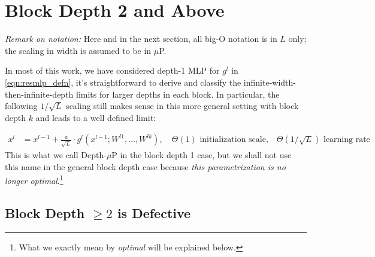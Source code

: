 \section{Block Depth 2 and Above}

\label{sec:bd2}

\emph{Remark on notation:} Here and in the next section, all big-O notation is in $L$ only; the scaling in width is assumed to be in $\mu$P.

In most of this work, we have considered depth-1 MLP for $g^l$ in \cref{eqn:resmlp_defn}, it's straightforward to derive and classify the infinite-width-then-infinite-depth limits for larger depths in each block.
In particular, the following $1/\sqrt{L}$ scaling still makes sense in this more general setting with block depth $k$ and leads to a well defined limit:

    \begin{align}
        x^{l}&=x^{l-1} +\frac a {\sqrt L} \cdot g^l(x^{l-1}; W^{l1}, \ldots, W^{lk}),\quad\text{$\Theta(1)$ initialization scale,}\quad\text{$\Theta(1/\sqrt L)$ learning rate}
    \end{align}
This is what we call Depth-$\mu$P in the block depth 1 case, but we shall not use this name in the general block depth case because \emph{this parametrization is no longer optimal}.\footnote{What we exactly mean by \emph{optimal} will be explained below.}

\subsection{Block Depth $\ge 2$ is Defective}


